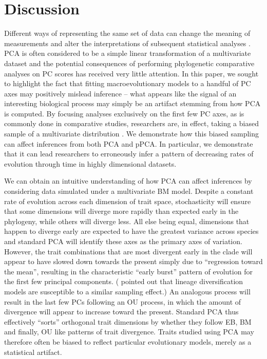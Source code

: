 \documentclass[a4paper,11pt]{article}
\begin{document}
\section{Discussion}
Different ways of representing the same set of data can change the meaning of measurements and alter the interpretations of subsequent statistical analyses \citep{Houle2011}. PCA is often considered to be a simple linear transformation of a multivariate dataset and the potential consequences of performing phylogenetic comparative analyses on PC scores has received very little attention. In this paper, we sought to highlight the fact that fitting macroevolutionary models to a handful of PC axes may positively mislead inference -- what appears like the signal of an interesting biological process may simply be an artifact stemming from how PCA is computed. By focusing analyses exclusively on the first few PC axes, as is commonly done in comparative studies, researchers are, in effect, taking a biased sample of a multivariate distribution \citep{Mitteroecker}. We demonstrate how this biased sampling can affect inferences from both PCA and pPCA. In particular, we demonstrate that it can lead researchers to erroneously infer a pattern of decreasing rates of evolution through time in highly dimensional datasets.

We can obtain an intuitive understanding of how PCA can affect inferences by considering data simulated under a multivariate BM model. Despite a constant rate of evolution across each dimension of trait space, stochasticity will ensure that some dimensions will diverge more rapidly than expected early in the phylogeny, while others will diverge less. All else being equal, dimensions that happen to diverge early are expected to have the greatest variance across species and standard PCA will identify these axes as the primary axes of variation. However, the trait combinations that are most divergent early in the clade will appear to have slowed down towards the present simply due to ``regression toward the mean'', resulting in the characteristic ``early burst'' pattern of evolution for the first few principal components. (\citet{Pennell2012} pointed out that lineage diversification models are susceptible to a similar sampling effect.) An analogous process will result in the last few PCs following an OU process, in which the amount of divergence will appear to increase toward the present. Standard PCA thus effectively ``sorts'' orthogonal trait dimensions by whether they follow EB, BM and finally, OU like patterns of trait divergence. Traits studied using PCA may therefore often be biased to reflect particular evolutionary models, merely as a statistical artifact. 
\end{document}
